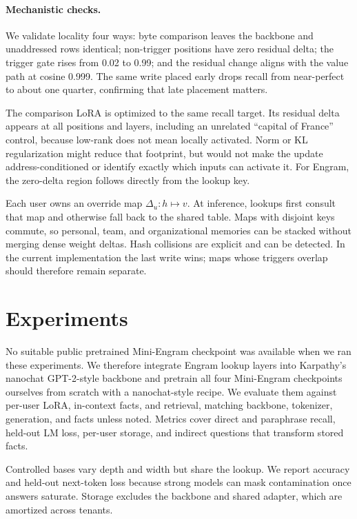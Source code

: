 \documentclass[letterpaper]{article} %
\begin{document}
\paragraph{Mechanistic checks.}
We validate locality four ways: byte comparison leaves the backbone and
unaddressed rows identical; non-trigger positions have zero residual delta;
the trigger gate rises from 0.02 to 0.99; and the residual change aligns with
the value path at cosine 0.999. The same write placed early drops recall from
near-perfect to about one quarter, confirming that late placement matters.

The comparison LoRA is optimized to the same recall target. Its residual delta
appears at all positions and layers, including an unrelated ``capital of
France'' control, because low-rank does not mean locally activated. Norm or KL
regularization might reduce that footprint, but would not make the update
address-conditioned or identify exactly which inputs can activate it.
For Engram, the zero-delta region follows directly from the lookup key.

Each user owns an override map $\Delta_u:h\mapsto v$. At inference, lookups
first consult that map and otherwise fall back to the shared table. Maps with
disjoint keys commute, so personal, team, and organizational memories can be
stacked without merging dense weight deltas. Hash collisions are explicit and
can be detected. In the current implementation the last write wins; maps whose
triggers overlap should therefore remain separate.

\section{Experiments}
\label{sec:experiments}

No suitable public pretrained Mini-Engram checkpoint was available when we ran
these experiments. We therefore
integrate Engram lookup layers into Karpathy's nanochat GPT-2-style backbone
\citep{karpathy2026nanochat,radford2019gpt2} and pretrain all four Mini-Engram
checkpoints ourselves from scratch with a nanochat-style recipe. We evaluate
them against per-user LoRA, in-context facts, and retrieval, matching backbone,
tokenizer, generation, and facts unless noted. Metrics cover direct and
paraphrase recall, held-out LM loss, per-user storage, and indirect questions
that transform stored facts.

Controlled bases vary depth and width but share the lookup. We report accuracy
and held-out next-token loss because strong models can mask contamination once
answers saturate. Storage excludes the backbone and shared adapter, which are
amortized across tenants.
\end{document}
